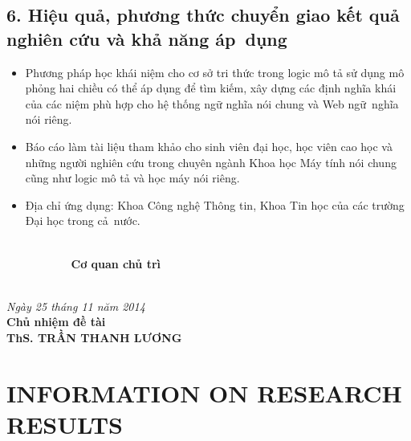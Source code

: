 \section*{6. Hiệu quả, phương thức chuyển giao kết quả nghiên cứu và khả năng áp~dụng}
\begin{itemize}
	\item Phương pháp học khái niệm cho cơ sở tri thức trong logic mô tả sử dụng mô phỏng hai chiều có thể áp dụng để tìm kiếm, xây dựng các định nghĩa khái của các niệm phù hợp cho hệ thống ngữ nghĩa nói chung và Web ngữ~nghĩa nói riêng.

	\item Báo cáo làm tài liệu tham khảo cho sinh viên đại học, học viên cao học và những người nghiên cứu trong chuyên ngành Khoa học Máy tính nói chung cũng như logic mô tả và học máy nói riêng.

	\item Địa chỉ ứng dụng: Khoa Công nghệ Thông tin, Khoa Tin học của các trường Đại học trong cả~nước.
\end{itemize}
\begin{minipage}{0.50\textwidth}
	\begin{flushleft}
		{~\;}\\[0.3cm]
		{\bf~~~~~~~~~~Cơ quan chủ trì} \\[2.4cm]
		{~\;}
	\end{flushleft}
\end{minipage}
\begin{minipage}{0.50\textwidth}
	\begin{center}
		\textit{Ngày 25 tháng 11 năm 2014}\\
		{\bf Chủ nhiệm đề tài} \\[2.4cm]
		{\bf ThS. TRẦN THANH LƯƠNG}
	\end{center}
\end{minipage}		

\newpage
\chapter*{INFORMATION ON RESEARCH RESULTS}
\thispagestyle{fancy}


